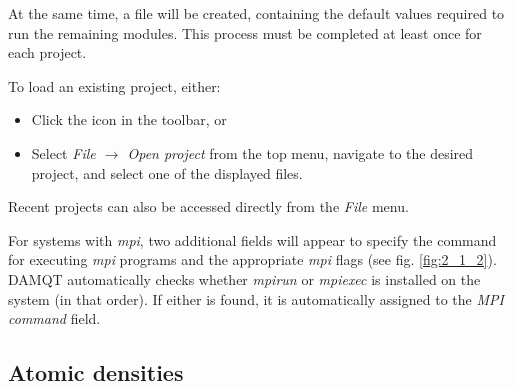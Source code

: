 \documentclass[10pt]{article}
\begin{document}
At the same time, a \damproj{ } file will be created,
containing the default values required to run the remaining modules.
This process must be completed at least once for each project.

To load an existing project, either:
\begin{itemize}
\item Click the \toolbA icon in the toolbar, or
\item Select {\it File $\rightarrow$ Open project} from the top menu,
navigate to the desired project, and select one of the displayed files.
\end{itemize}

Recent projects can also be accessed directly from the {\it File} menu.

For systems with {\it mpi}, two additional fields will appear
to specify the command for executing {\it mpi} programs
and the appropriate {\it mpi} flags (see fig. \ref{fig:2_1_2}).
DAMQT automatically checks whether {\it mpirun} or {\it mpiexec}
is installed on the system (in that order).
If either is found, it is automatically assigned to the {\it MPI command} field.

\subsection{Atomic densities \label{sec:2.2}}
\end{document}
